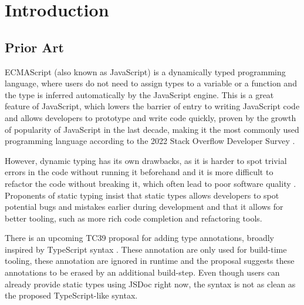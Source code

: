 \chapter*{Introduction}
\setcounter{page}{1}

\section{Prior Art}

ECMAScript (also known as JavaScript) is a dynamically typed programming language, where users do not need to assign types to a variable or a function and the type is inferred automatically by the JavaScript engine. This is a great feature of JavaScript, which lowers the barrier of entry to writing JavaScript code and allows developers to prototype and write code quickly, proven by the growth of popularity of JavaScript in the last decade, making it the most commonly used programming language according to the 2022 Stack Overflow Developer Survey \cite{StackOverflowDeveloper}.

However, dynamic typing has its own drawbacks, as it is harder to spot trivial errors in the code without running it beforehand and it is more difficult to refactor the code without breaking it, which often lead to poor software quality \cite{fardJSNOSEDetectingJavaScript2013a}. Proponents of static typing insist that static types allows developers to spot potential bugs and mistakes earlier during development and that it allows for better tooling, such as more rich code completion and refactoring tools.

There is an upcoming TC39 proposal for adding type annotations, broadly inspired by TypeScript syntax \cite{ECMAScriptProposalType2023}. These annotation are only used for build-time tooling, these annotation are ignored in runtime and the proposal suggests these annotations to be erased by an additional build-step. Even though users can already provide static types using JSDoc right now, the syntax is not as clean as the proposed TypeScript-like syntax.

